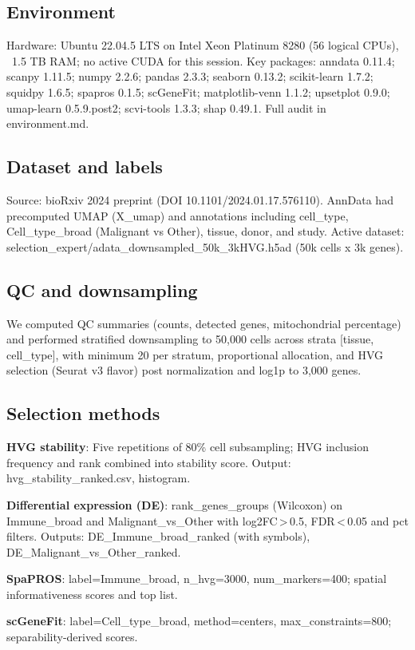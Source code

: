 \documentclass[11pt]{article}
\begin{document}
\subsection{Environment}
Hardware: Ubuntu 22.04.5 LTS on Intel Xeon Platinum 8280 (56 logical CPUs), ~1.5 TB RAM; no active CUDA for this session. Key packages: anndata 0.11.4; scanpy 1.11.5; numpy 2.2.6; pandas 2.3.3; seaborn 0.13.2; scikit-learn 1.7.2; squidpy 1.6.5; spapros 0.1.5; scGeneFit; matplotlib-venn 1.1.2; upsetplot 0.9.0; umap-learn 0.5.9.post2; scvi-tools 1.3.3; shap 0.49.1. Full audit in environment.md.

\subsection{Dataset and labels}
Source: bioRxiv 2024 preprint (DOI 10.1101/2024.01.17.576110). AnnData had precomputed UMAP (X\_umap) and annotations including cell\_type, Cell\_type\_broad (Malignant vs Other), tissue, donor, and study. Active dataset: selection\_expert/adata\_downsampled\_50k\_3kHVG.h5ad (50k cells x 3k genes).

\subsection{QC and downsampling}
We computed QC summaries (counts, detected genes, mitochondrial percentage) and performed stratified downsampling to 50{,}000 cells across strata [tissue, cell\_type], with minimum 20 per stratum, proportional allocation, and HVG selection (Seurat v3 flavor) post normalization and log1p to 3{,}000 genes.

\subsection{Selection methods}
\textbf{HVG stability}: Five repetitions of 80\% cell subsampling; HVG inclusion frequency and rank combined into stability score. Output: hvg\_stability\_ranked.csv, histogram.

\textbf{Differential expression (DE)}: rank\_genes\_groups (Wilcoxon) on Immune\_broad and Malignant\_vs\_Other with log2FC\,>\,0.5, FDR\,<\,0.05 and pct filters. Outputs: DE\_Immune\_broad\_ranked (with symbols), DE\_Malignant\_vs\_Other\_ranked.

\textbf{SpaPROS}: label=Immune\_broad, n\_hvg=3000, num\_markers=400; spatial informativeness scores and top list.

\textbf{scGeneFit}: label=Cell\_type\_broad, method=centers, max\_constraints=800; separability-derived scores.
\end{document}
